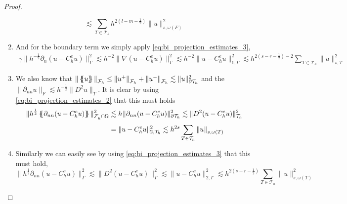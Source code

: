\begin{proof}
\begin{enumerate}[label=\arabic*)]
{\[                                                                                                                 \lesssim \sum_{T \in \mathcal{T}_{h} }^{}
                                                                                                                 h^{ 2(l - m - \frac{1}{2})  } \| u      \|_{ s, \omega (  F)  }^{  2}
    \]  }
\item
    And for the boundary term we simply apply \eqref{eq:bi_projection_estimates_3}, \[
        \begin{split}
            \gamma \| h^{-\frac{1}{2}}  \partial _{n} ( u - C_{h}^{e}u ) \|_{ \Gamma    }^{  2} \lesssim h^{-2} \|   \nabla  ( u - C_{h}^{e}u )    \|_{ \Gamma  }^{2  } \lesssim  h^{-2} \|    u - C_{h}^{e}u     \|_{1, \Gamma  }^{2  }\lesssim h^{2(s- r-
            \frac{1}{2}) -2}
              \sum_{T \in \mathcal{T} _{h}}^{}  \| u \|_{s,T  }^{  2}
        \end{split}
    \]
\item

            We also know that $\| \left\{\!\!\left\{ u \right\}\!\!\right\}   \|_{ \mathcal{F} _{h} }^{  } \le \| u^{+} \|_{ \mathcal{F} _{h}  }^{  } + \| u^{-} \|_{ \mathcal{F} _{h}  }^{  }   \lesssim  \| u \|_{ \partial\mathcal{T }_{h}  }^{2  }  $ and the $\| \partial _{nn} u \|_{ F  }^{} \lesssim h^{-\frac{1}{2}} \| D^2 u \|_{ T }^{  }  $. It is clear
            by using \eqref{eq:bi_projection_estimates_2} that this must holds
            \[
                \begin{split}
 \| h^{\frac{1}{2}} \left\{\!\!\left\{ \partial _{nn} (u - C_{h}^{e}u) \right\}\!\!\right\}   \|_{\mathcal{F} _{h}^{} \cap \Omega   }^{  2} &  \lesssim h^{} \|   \partial _{nn} (u - C_{h}^{e}u)    \|_{\partial \mathcal{T} _{h}   }^{  2}  \lesssim  \|   D^2 (u - C_{h}^{e}u)    \|_{ \mathcal{T} _{h}   }^{  2} \\
                                                                                                                &  = \|   u - C_{h}^{e}u    \|_{ 2, \mathcal{T} _{h}   }^{  2} \lesssim h^{2s} \sum_{T \in \mathcal{T}_h}^{} \| u \|_{s, \omega ( T)   }^{  }
                \end{split}
            \]
            \item
                Similarly we can easily see by using \eqref{eq:bi_projection_estimates_3} that this must hold,
                \[
              \| h^{\frac{1}{2}} \partial _{nn}(u - C_{h}^{e}u)     \|_{ \Gamma }^{  2} \lesssim   \|  D^2(u - C_{h}^{e}u)     \|_{ \Gamma  }^{  2} \lesssim \|  u - C_{h}^{e}u \|_{ 2, \Gamma}^{2  } \lesssim h^{2(s-r -\frac{1}{2})} \sum_{T \in
              \mathcal{T}_h }^{} \| u \|_{ s, \omega ( T)  }^{2  }
            \]
    \end{enumerate}


\end{proof}
